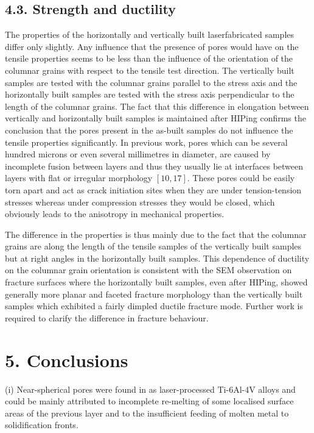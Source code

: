 \documentclass[10pt]{article}
\begin{document}
\subsection*{4.3. Strength and ductility}
The properties of the horizontally and vertically built laserfabricated samples differ only slightly. Any influence that the presence of pores would have on the tensile properties seems to be less than the influence of the orientation of the columnar grains with respect to the tensile test direction. The vertically built samples are tested with the columnar grains parallel to the stress axis and the horizontally built samples are tested with the stress axis perpendicular to the length of the columnar grains. The fact that this difference in elongation between vertically and horizontally built samples is maintained after HIPing confirms the conclusion that the pores present in the as-built samples do not influence the tensile properties significantly. In previous work, pores which can be several hundred microns or even several millimetres in diameter, are caused by incomplete fusion between layers and thus they usually lie at interfaces between layers with flat or irregular morphology $[10,17]$. These pores could be easily torn apart and act as crack initiation sites when they are under tension-tension stresses whereas under compression stresses they would be closed, which obviously leads to the anisotropy in mechanical properties.

The difference in the properties is thus mainly due to the fact that the columnar grains are along the length of the tensile samples of the vertically built samples but at right angles in the horizontally built samples. This dependence of ductility on the columnar grain orientation is consistent with the SEM observation on fracture surfaces where the horizontally built samples, even after HIPing, showed generally more planar and faceted fracture morphology than the vertically built samples which exhibited a fairly dimpled ductile fracture mode. Further work is required to clarify the difference in fracture behaviour.

\section*{5. Conclusions}
(i) Near-spherical pores were found in as laser-processed Ti-6Al-4V alloys and could be mainly attributed to incomplete re-melting of some localised surface areas of the previous layer and to the insufficient feeding of molten metal to solidification fronts.
\end{document}
